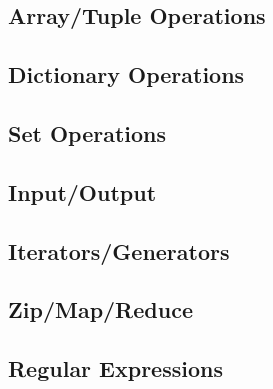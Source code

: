\documentclass[a4paper,11pt]{article}
\begin{document}
\subsection{Array/Tuple Operations}

\subsection{Dictionary Operations}

\subsection{Set Operations}

\subsection{Input/Output}

\subsection{Iterators/Generators}

\subsection{Zip/Map/Reduce}

\subsection{Regular Expressions}
\end{document}
